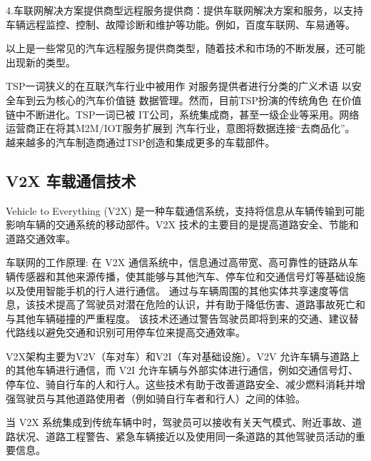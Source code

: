   4.车联网解决方案提供商型远程服务提供商：提供车联网解决方案和服务，以支持车辆远程监控、控制、故障诊断和维护等功能。例如，百度车联网、车易通等。
  
  以上是一些常见的汽车远程服务提供商类型，随着技术和市场的不断发展，还可能出现新的类型。

TSP一词狭义的在互联汽车行业中被用作
对服务提供者进行分类的广义术语
以安全车到云为核心的汽车价值链
数据管理。然而，目前TSP扮演的传统角色
在价值链中不断进化。TSP一词已被
IT公司，系统集成商，甚至一级企业等采用。网络
运营商正在将其M2M/IOT服务扩展到
汽车行业，意图将数据连接“去商品化”。
越来越多的汽车制造商通过TSP创造和集成更多的车载部件。

\subsection{V2X 车载通信技术}

Vehicle to Everything (V2X) 是一种车载通信系统，支持将信息从车辆传输到可能影响车辆的交通系统的移动部件。V2X 技术的主要目的是提高道路安全、节能和道路交通效率。

车联网的工作原理: 在 V2X 通信系统中，信息通过高带宽、高可靠性的链路从车辆传感器和其他来源传播，使其能够与其他汽车、停车位和交通信号灯等基础设施以及使用智能手机的行人进行通信。
通过与车辆周围的其他实体共享速度等信息，该技术提高了驾驶员对潜在危险的认识，并有助于降低伤害、道路事故死亡和与其他车辆碰撞的严重程度。
该技术还通过警告驾驶员即将到来的交通、建议替代路线以避免交通和识别可用停车位来提高交通效率。

V2X架构主要为V2V（车对车）和V2I（车对基础设施）。V2V 允许车辆与道路上的其他车辆进行通信，而 V2I 允许车辆与外部实体进行通信，例如交通信号灯、停车位、骑自行车的人和行人。这些技术有助于改善道路安全、减少燃料消耗并增强驾驶员与其他道路使用者（例如骑自行车者和行人）之间的体验。

当 V2X 系统集成到传统车辆中时，驾驶员可以接收有关天气模式、附近事故、道路状况、道路工程警告、紧急车辆接近以及使用同一条道路的其他驾驶员活动的重要信息。

